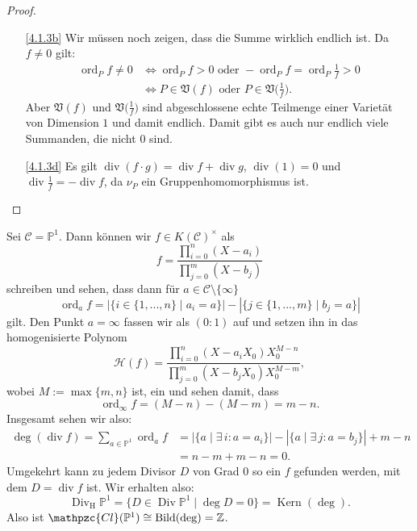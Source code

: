 \documentclass[a4paper,12pt,index=toc]{scrbook}
\theoremstyle{keinenummern} %
\def\CC{\mathcal{C}}
\def\V{\mathfrak{V}}
\def\P{\mathbb{P}}
\renewcommand{\H}{\mathcal{H}} %
\newcommand{\Cl}{\mathpzc{Cl}}
\newcommand{\Kern}{\operatorname{Kern}}
\newcommand{\Bild}{\operatorname{Bild}}
\newcommand{\Div}{\operatorname{Div}}
\newcommand{\Divh}{\Div_{\mathrm{H}}}
\renewcommand{\div}{\operatorname{div}}
\newcommand{\ord}{\operatorname{ord}}
\newcommand{\card}[1]{|#1|}
\renewcommand{\dotsc}{\ensuremath{\!...}}
\newcommand{\set}[1]{\ensuremath{\mathbb{#1}}}
\newcommand{\Z}{\set{Z}}
\begin{document}
\begin{proof}\begin{enumerate}
\item[\ref{4.1.3b}] Wir müssen noch zeigen, dass die Summe wirklich endlich ist. Da $f\neq 0$ gilt:
\begin{align*}
\ord_{P}f\neq 0&\iff\ord_{P}f>0\text{ oder }-\ord_{P}f=\ord_{P}\tfrac{1}{f}>0\\
&\iff P\in\V(f)\text{ oder }P\in\V\bigl(\tfrac{1}{f}\bigr).
\end{align*}
Aber $\V(f)$ und $\V\bigl(\tfrac{1}{f}\bigr)$ sind abgeschlossene echte Teilmenge einer Varietät von Dimension $1$ und damit endlich. Damit gibt es auch nur endlich viele Summanden, die nicht $0$ sind.
\item[\ref{4.1.3d}] Es gilt $\div(f\cdot g)=\div f + \div g$, $\div(1)=0$ und $\div\frac{1}{f}=-\div f$, da $\nu_{P}$ ein Gruppenhomomorphismus ist.
\end{enumerate}\end{proof}

\begin{bsp}\label{4.1.4}
Sei $\CC=\P^{1}$. Dann können wir $f\in K(\CC)^{\times}$ als
\begin{equation*}f=\frac{\displaystyle\prod_{i=0}^{n}(X-a_{i})}{\displaystyle\prod_{j=0}^{m}(X-b_{j})}\end{equation*}
schreiben und sehen, dass dann für $a\in\CC\setminus\{\infty\}$
\begin{equation*}\ord_{a}f=\card{\{i\in\{1,\dotsc,n\}\mid a_{i}=a\}}-\card{\{j\in\{1,\dotsc,m\}\mid b_{j}=a\}}\end{equation*}
gilt. Den Punkt $a=\infty$ fassen wir als $(0:1)$ auf und setzen ihn in das homogenisierte Polynom
\begin{equation*}\H(f)=\frac{\displaystyle\prod_{i=0}^{n}(X-a_{i}X_{0})X_{0}^{M-n}}{\displaystyle\prod_{j=0}^{m}(X-b_{j}X_{0})X_{0}^{M-m}},\end{equation*}
wobei $M:=\max\{m,n\}$ ist, ein und sehen damit, dass
\begin{equation*}\ord_{\infty}f=(M-n)-(M-m)=m-n.\end{equation*}
Insgesamt sehen wir also:
\begin{align*}
\deg(\div f)=\sum_{a\in\P^{1}}\ord_{a}f&=\card{\{a\mid \exists\, i: a=a_{i}\}}-\card{\{a\mid \exists\, j: a=b_{j}\}}+m-n\\
&=n-m+m-n=0.
\end{align*}
Umgekehrt kann zu jedem Divisor $D$ von Grad $0$ so ein $f$ gefunden werden, mit dem $D=\div f$ ist. Wir erhalten also:
\begin{equation*}\Divh\P^{1}=\{D\in\Div\P^{1}\mid\deg D=0\}=\Kern(\deg).\end{equation*}
Also ist $\Cl(\P^{1})\cong\Bild(\deg)=\Z$.
\end{bsp}
\end{document}
